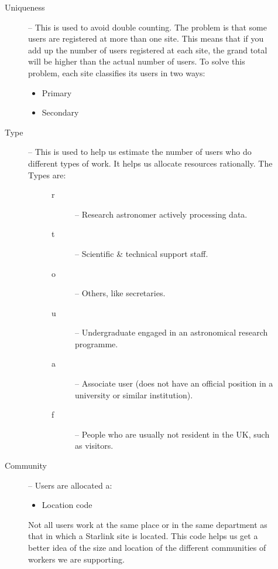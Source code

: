 \documentclass[twoside,11pt]{article}
\begin{document}
\begin{description}
\item[\mbox{}]\mbox{}
\begin{description}
\item [Uniqueness] --
 This is used to avoid double counting.
 The problem is that some users are registered at more than one site.
 This means that if you add up the number of users registered at each site,
 the grand total will be higher than the actual number of users.
 To solve this problem, each site classifies its users in two ways:
 \begin{itemize}
 \item Primary
 \item Secondary
 \end{itemize}
\item [Type] --
 This is used to help us estimate the number of users who do different types
 of work.
 It helps us allocate resources rationally.
 The Types are:
 \begin{description}
\item[\mbox{}]\mbox{}
 \begin{description}
 \item [r] -- Research astronomer actively processing data.
 \item [t] -- Scientific \& technical support staff.
 \item [o] -- Others, like secretaries.
 \item [u] -- Undergraduate engaged in an astronomical research programme.
 \item [a] -- Associate user (does not have an official position in a
              university or similar institution).
 \item [f] -- People who are usually not resident in the UK, such as visitors.
 \end{description}
 \end{description}
\item [Community] --
 Users are allocated a:
 \begin{itemize}
 \item Location code
 \end{itemize}
 Not all users work at the same place or in the same department as that in
 which a Starlink site is located.
 This code helps us get a better idea of the size and location of the different
 communities of workers we are supporting.
\end{description}
\end{description}
\end{document}
